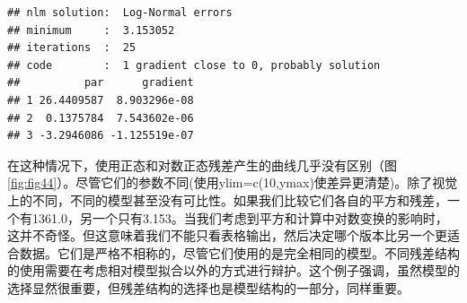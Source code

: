 \documentclass[
  lang=cn,
  11pt,
  scheme=chinese,
  chinesefont=nofont,
  citestyle=gb7714-2015,
  bibstyle=gb7714-2015]{elegantbook}
\begin{document}
\begin{verbatim}
## nlm solution:  Log-Normal errors 
## minimum     :  3.153052 
## iterations  :  25 
## code        :  1 gradient close to 0, probably solution 
##          par      gradient
## 1 26.4409587  8.903296e-08
## 2  0.1375784  7.543602e-06
## 3 -3.2946086 -1.125519e-07
\end{verbatim}

在这种情况下，使用正态和对数正态残差产生的曲线几乎没有区别（图\ref{fig:fig44}）。尽管它们的参数不同(使用ylim=c(10,ymax)使差异更清楚)。除了视觉上的不同，不同的模型甚至没有可比性。如果我们比较它们各自的平方和残差，一个有1361.0，另一个只有3.153。当我们考虑到平方和计算中对数变换的影响时，这并不奇怪。但这意味着我们不能只看表格输出，然后决定哪个版本比另一个更适合数据。它们是严格不相称的，尽管它们使用的是完全相同的模型。不同残差结构的使用需要在考虑相对模型拟合以外的方式进行辩护。这个例子强调，虽然模型的选择显然很重要，但残差结构的选择也是模型结构的一部分，同样重要。
\end{document}
